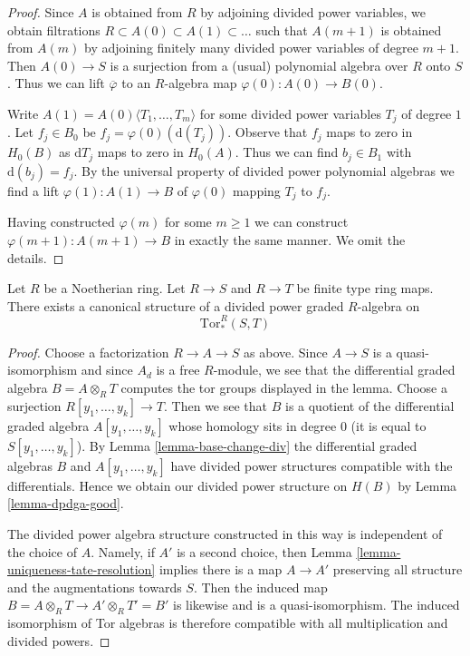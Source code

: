 \begin{proof}
Since $A$ is obtained from $R$ by adjoining
divided power variables, we obtain filtrations
$R \subset A(0) \subset A(1) \subset \ldots$
such that $A(m + 1)$ is obtained from $A(m)$ by adjoining finitely many
divided power variables of degree $m + 1$.
Then $A(0) \to S$ is a surjection from a (usual) polynomial
algebra over $R$ onto $S$. Thus we can lift $\overline{\varphi}$
to an $R$-algebra map $\varphi(0) : A(0) \to B(0)$.

\medskip\noindent
Write $A(1) = A(0)\langle T_1, \ldots, T_m\rangle$ for some
divided power variables $T_j$ of degree $1$. Let $f_j \in B_0$
be $f_j = \varphi(0)(\text{d}(T_j))$. Observe that $f_j$
maps to zero in $H_0(B)$ as $\text{d}T_j$ maps to zero in $H_0(A)$.
Thus we can find $b_j \in B_1$ with $\text{d}(b_j) = f_j$.
By the universal property of divided power polynomial algebras
we find a lift $\varphi(1) : A(1) \to B$ of $\varphi(0)$
mapping $T_j$ to $f_j$.

\medskip\noindent
Having constructed $\varphi(m)$ for some $m \geq 1$ we can construct
$\varphi(m + 1) : A(m + 1) \to B$ in exactly the same manner.
We omit the details.
\end{proof}

\begin{lemma}
\label{lemma-divided-powers-on-tor}
Let $R$ be a Noetherian ring. Let $R \to S$ and $R \to T$ be
finite type ring maps. There exists a canonical structure
of a divided power graded $R$-algebra on
$$
\text{Tor}_*^R(S, T)
$$
\end{lemma}

\begin{proof}
Choose a factorization $R \to A \to S$ as above. Since $A \to S$
is a quasi-isomorphism and since $A_d$ is a free $R$-module,
we see that the differential graded algebra $B = A \otimes_R T$ computes
the tor groups displayed in the lemma. Choose a surjection
$R[y_1, \ldots, y_k] \to T$. Then we see that
$B$ is a quotient of the differential graded algebra
$A[y_1, \ldots, y_k]$ whose homology sits in degree $0$ (it is equal
to $S[y_1, \ldots, y_k]$).
By Lemma \ref{lemma-base-change-div} the differential graded algebras $B$ and
$A[y_1, \ldots, y_k]$ have divided power structures compatible
with the differentials. Hence we obtain our divided
power structure on $H(B)$ by Lemma \ref{lemma-dpdga-good}.

\medskip\noindent
The divided power algebra structure constructed in this way is independent
of the choice of $A$. Namely, if $A'$ is a second choice, then
Lemma \ref{lemma-uniqueness-tate-resolution}
implies there is a map $A \to A'$ preserving all structure and the
augmentations towards $S$. Then the induced map
$B = A \otimes_R T \to A' \otimes_R T' = B'$ is likewise
and is a quasi-isomorphism. The induced isomorphism of
Tor algebras is therefore compatible with all multiplication
and divided powers.
\end{proof}





